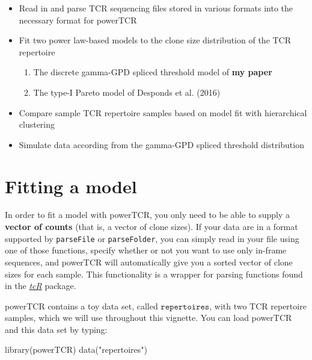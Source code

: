 \documentclass[]{article}
\providecommand{\tightlist}{%
  \setlength{\itemsep}{0pt}\setlength{\parskip}{0pt}}
\newcommand{\hlstr}[1]{\textcolor[rgb]{0.251,0.627,0.251}{#1}}%
\newcommand{\hlstd}[1]{\textcolor[rgb]{0.251,0.251,0.251}{#1}}%
\newcommand{\hlkwd}[1]{\textcolor[rgb]{0.878,0.439,0.125}{#1}}%
\newenvironment{Shaded}{\begin{myshaded}}{\end{myshaded}}
\newcommand{\KeywordTok}[1]{\hlkwd{#1}}
\newcommand{\StringTok}[1]{\hlstr{#1}}
\newcommand{\NormalTok}[1]{\hlstd{#1}}
\theoremstyle{definition}
\theoremstyle{definition}
\theoremstyle{definition}
\theoremstyle{remark}
\begin{document}
\begin{itemize}
\tightlist
\item
  Read in and parse TCR sequencing files stored in various formats into
  the necessary format for powerTCR
\item
  Fit two power law-based models to the clone size distribution of the
  TCR repertoire

  \begin{enumerate}
  \def\labelenumi{\arabic{enumi}.}
  \tightlist
  \item
    The discrete gamma-GPD spliced threshold model of \textbf{my paper}
  \item
    The type-I Pareto model of Desponds et al. (2016)
  \end{enumerate}
\item
  Compare sample TCR repertoire samples based on model fit with
  hierarchical clustering
\item
  Simulate data according from the gamma-GPD spliced threshold
  distribution
\end{itemize}

\section{Fitting a model}\label{fitting-a-model}

In order to fit a model with powerTCR, you only need to be able to
supply a \textbf{vector of counts} (that is, a vector of clone sizes).
If your data are in a format supported by \texttt{parseFile} or
\texttt{parseFolder}, you can simply read in your file using one of
those functions, specify whether or not you want to use only in-frame
sequences, and powerTCR will automatically give you a sorted vector of
clone sizes for each sample. This functionality is a wrapper for parsing
functions found in the
\emph{\href{https://CRAN.R-project.org/package=tcR}{tcR}} package.

powerTCR contains a toy data set, called \(\texttt{repertoires}\), with
two TCR repertoire samples, which we will use throughout this vignette.
You can load powerTCR and this data set by typing:

\begin{Shaded}
\begin{Highlighting}[]
\KeywordTok{library}\NormalTok{(powerTCR)}
\KeywordTok{data}\NormalTok{(}\StringTok{"repertoires"}\NormalTok{)}
\end{Highlighting}
\end{Shaded}
\end{document}
